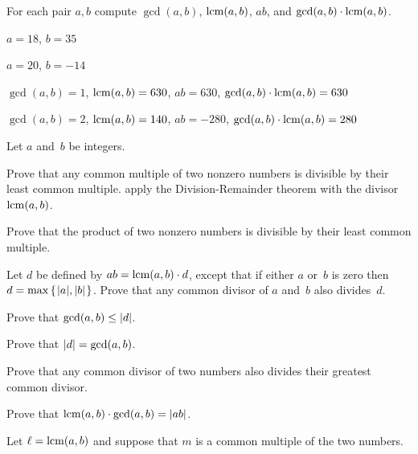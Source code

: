 \documentclass{ibl}
\begin{document}
\begin{euclidproof}
\begin{ex}
For each pair $a,b$ compute $\gcd(a,b)$, $\operatorname{lcm}(a,b)$, $ab$, and
$\gcd(a,b)\cdot\operatorname{lcm}(a,b)$.
\begin{exes}
\item $a=18$, $b=35$  
\item $a=20$, $b=-14$
\end{exes}
\begin{ans}
\begin{exes}
\item $\gcd(a,b)=1$, $\operatorname{lcm}(a,b)=630$, $ab=630$, $\gcd(a,b)\cdot\operatorname{lcm}(a,b)=630$
\item $\gcd(a,b)=2$, $\operatorname{lcm}(a,b)=140$, $ab=-280$, $\gcd(a,b)\cdot\operatorname{lcm}(a,b)=280$
\end{exes}
\end{ans}
\end{ex}

\begin{ex} Let $a$ and~$b$ be integers.
\begin{exes}
\item Prove that any common multiple of two nonzero
   numbers is divisible by their 
  least common multiple.
  \hint apply the Division-Remainder theorem with the divisor $\operatorname{lcm}(a,b)$.
\item Prove that the product of two nonzero numbers is divisible by their 
  least common multiple.
\item Let $d$ be defined by 
  $ab=\operatorname{lcm}(a,b)\cdot d$, except that if either $a$ or~$b$ is zero
  then $d=\max\mbox{$\{\hspace{0.1em}\lvert a\rvert,\lvert b\rvert\hspace{0.1em}\}$}$.
  Prove that any common divisor of $a$ and~$b$ also divides~$d$.
\item Prove that $\gcd(a,b)\leq\lvert d\rvert$.
\item Prove that $\lvert d\rvert=\gcd(a,b)$. 
\item Prove that any common divisor of two numbers also divides their
  greatest common divisor.
\item Prove that $\operatorname{lcm}(a,b)\cdot\gcd(a,b)=\lvert ab\rvert$. 
\end{exes}  
\begin{ans}  %
\begin{exes}
\item Let $\ell=\operatorname{lcm}(a,b)$ and suppose that $m$ is a common multiple
  of the two numbers.


\end{exes}
\end{ans}
\end{ex}
\end{euclidproof}
\end{document}
